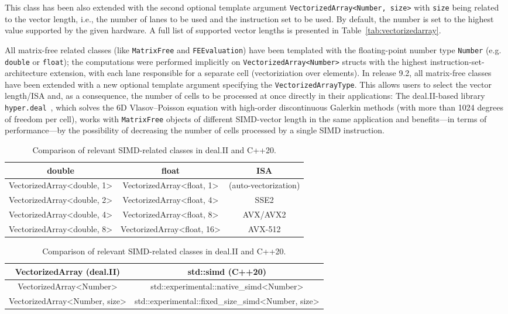 \documentclass{ansarticle-preprint}
\begin{document}
This class has been also extended with the second optional template argument 
\texttt{VectorizedArray<Number, size>} with \texttt{size} being related to the 
vector length, i.e., the number of lanes to be used and the instruction set to be 
used. By default, the number is set to the highest value supported by the given 
hardware. A full list of supported 
vector lengths is presented in Table~\ref{tab:vectorizedarray}.

All matrix-free related classes (like \texttt{MatrixFree} and \texttt{FEEvaluation}) 
have been templated with the floating-point number type \texttt{Number} (e.g. \texttt{double} or \texttt{float}); the computations were performed implicitly 
on \texttt{VectorizedArray<Number>} structs with the highest 
instruction-set-architecture extension, with each lane responsible for a separate 
cell (vectoriziation over elements). In release 9.2, all matrix-free classes 
have been extended with a new optional template argument specifying the 
\texttt{VectorizedArrayType}. This allows users to select the vector length/ISA and, 
as a consequence, the number of cells to be processed at once directly in their applications: 
The deal.II-based 
library \texttt{hyper.deal}~\cite{munch2020hyperdeal}, which solves the 6D Vlasov--Poisson equation with high-order 
discontinuous Galerkin methods (with more than 1024 degrees of freedom per cell), works with \texttt{MatrixFree} objects of different SIMD-vector 
length in the same application and benefits---in terms of performance---by the possibility of decreasing the number of cells processed by a single SIMD instruction.

\begin{table}
\caption{Supported vector lengths of the class \texttt{VectorizedArray} and 
the corresponding instruction-set-architecture extensions. }\label{tab:vectorizedarray}
\centering
\begin{tabular}{ccc}
\toprule
\textbf{double} & \textbf{float} & \textbf{ISA}\\
\midrule
VectorizedArray<double, 1> & VectorizedArray<float, 1> & (auto-vectorization) \\
VectorizedArray<double, 2> & VectorizedArray<float, 4> & SSE2 \\ 
VectorizedArray<double, 4> & VectorizedArray<float, 8> & AVX/AVX2 \\ 
VectorizedArray<double, 8> & VectorizedArray<float, 16> & AVX-512 \\ 
\bottomrule
\end{tabular}

\caption{Comparison of relevant SIMD-related classes in deal.II and C++20.}\label{tab:simd}
\centering
\begin{tabular}{cc}
\toprule
\textbf{VectorizedArray (deal.II)} & \textbf{std::simd (C++20)} \\
\midrule
VectorizedArray<Number> & std::experimental::native\_simd<Number> \\
VectorizedArray<Number, size> & std::experimental::fixed\_size\_simd<Number, size> \\ \bottomrule
\end{tabular}
\end{table}
\end{document}
